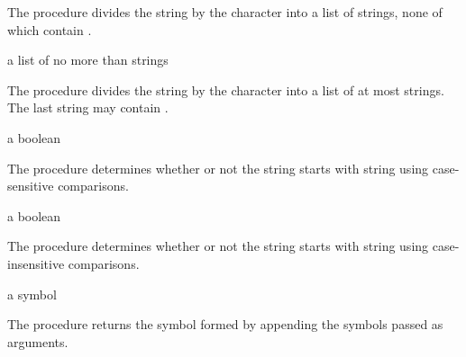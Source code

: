 The  procedure divides the  string by the
 character into a list of strings, none of which
contain .

\begin{procedure}
\end{procedure}
\returns{} a list of no more than  strings

The  procedure divides the  string by the
 character into a list of at most  strings. The
last string may contain .

\begin{procedure}
\end{procedure}
\returns{} a boolean

The  procedure determines whether or not the string
 starts with string  using case-sensitive comparisons.

\begin{procedure}
\end{procedure}
\returns{} a boolean

The  procedure determines whether or not the
string  starts with string  using case-insensitive
comparisons.

\begin{procedure}
\end{procedure}
\returns{} a symbol

The  procedure returns the symbol formed by
appending the symbols passed as arguments.
